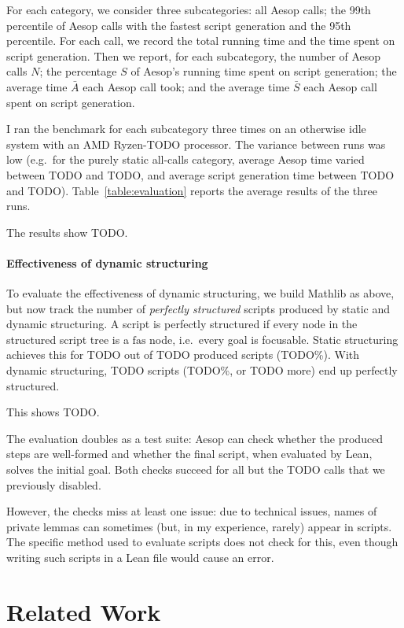 \documentclass[sigplan,10pt,anonymous,review]{acmart}
\begin{document}
For each category, we consider three subcategories: all Aesop calls; the 99th percentile of Aesop calls with the fastest script generation and the 95th percentile.
For each call, we record the total running time and the time spent on script generation.
Then we report, for each subcategory, the number of Aesop calls $N$; the percentage $S$ of Aesop's running time spent on script generation; the average time $\bar{A}$ each Aesop call took; and the average time $\bar{S}$ each Aesop call spent on script generation.

I ran the benchmark for each subcategory three times on an otherwise idle system with an AMD Ryzen-TODO processor.
The variance between runs was low (e.g.\ for the purely static all-calls category, average Aesop time varied between TODO and TODO, and average script generation time between TODO and TODO).
Table~\ref{table:evaluation} reports the average results of the three runs.

The results show TODO.

\paragraph{Effectiveness of dynamic structuring}
To evaluate the effectiveness of dynamic structuring, we build Mathlib as above, but now track the number of \emph{perfectly structured} scripts produced by static and dynamic structuring.
A script is perfectly structured if every node in the structured script tree is a $\mathrm{fas}$ node, i.e.\ every goal is focusable.
Static structuring achieves this for TODO out of TODO produced scripts (TODO\%).
With dynamic structuring, TODO scripts (TODO\%, or TODO more) end up perfectly structured.

This shows TODO.

\medskip

The evaluation doubles as a test suite: Aesop can check whether the produced steps are well-formed and whether the final script, when evaluated by Lean, solves the initial goal.
Both checks succeed for all but the TODO calls that we previously disabled.

However, the checks miss at least one issue: due to technical issues, names of private lemmas can sometimes (but, in my experience, rarely) appear in scripts.
The specific method used to evaluate scripts does not check for this, even though writing such scripts in a Lean file would cause an error.

\section{Related Work}%
\label{sec:related}
\end{document}
